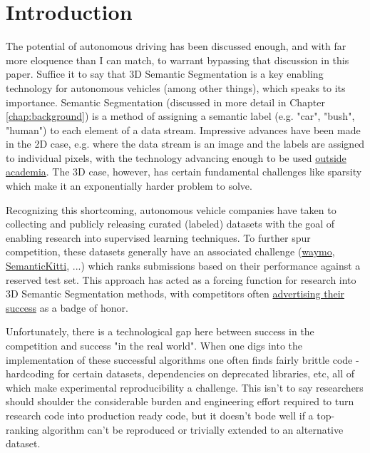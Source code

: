 \section{Introduction}
\label{chap:introduction}

The potential of autonomous driving has been discussed enough, and with far more eloquence than I can match, to warrant bypassing that discussion in this paper. Suffice it to say that 3D Semantic Segmentation is a key enabling technology for autonomous vehicles (among other things), which speaks to its importance. Semantic Segmentation (discussed in more detail in Chapter \ref{chap:background}) is a method of assigning a semantic label (e.g. "car", "bush", "human") to each element of a data stream. Impressive advances have been made in the 2D case, e.g. where the data stream is an image and the labels are assigned to individual pixels, with the technology advancing enough to be used \href{https://nanonets.com/blog/semantic-image-segmentation-2020/}{outside academia}. The 3D case, however, has certain fundamental challenges like sparsity which make it an exponentially harder problem to solve.

Recognizing this shortcoming, autonomous vehicle companies have taken to collecting and publicly releasing curated (labeled) datasets with the goal of enabling research into supervised learning techniques. To further spur competition, these datasets generally have an associated challenge (\href{https://waymo.com/open/challenges/}{waymo}, \href{https://codalab.lisn.upsaclay.fr/competitions/6280}{SemanticKitti}, ...) which ranks submissions based on their performance against a reserved test set. This approach has acted as a forcing function for research into 3D Semantic Segmentation methods, with competitors often \href{https://github.com/xinge008/Cylinder3D}{advertising their success} as a badge of honor.

Unfortunately, there is a technological gap here between success in the competition and success "in the real world". When one digs into the implementation of these successful algorithms one often finds fairly brittle code - hardcoding for certain datasets, dependencies on deprecated libraries, etc, all of which make experimental reproducibility a challenge. This isn't to say researchers should shoulder the considerable burden and engineering effort required to turn research code into production ready code, but it doesn't bode well if a top-ranking algorithm can't be reproduced or trivially extended to an alternative dataset.

